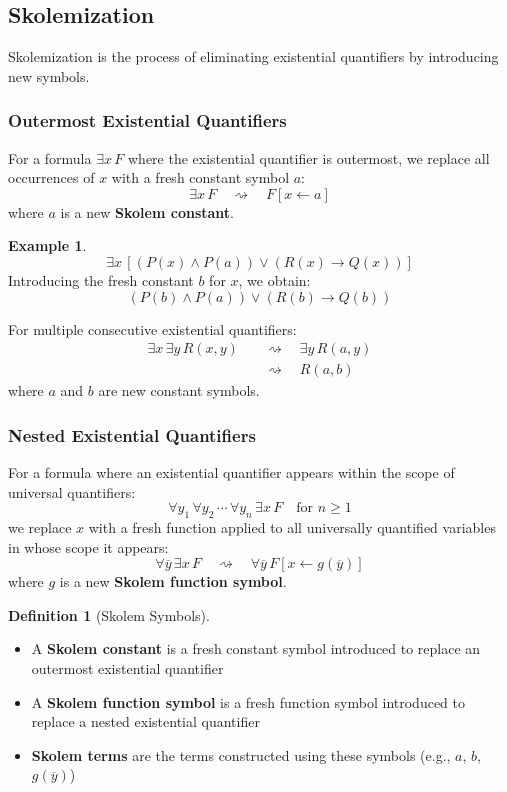 \documentclass[11pt,a4paper]{article}
\theoremstyle{definition}
\newtheorem{definition}{Definition}[section]
\newtheorem{example}{Example}[section]
\theoremstyle{plain}
\theoremstyle{remark}
\begin{document}
\subsection{Skolemization}

Skolemization is the process of eliminating existential quantifiers by introducing new symbols.

\subsubsection{Outermost Existential Quantifiers}

For a formula $\exists x \, F$ where the existential quantifier is outermost, we replace all occurrences of $x$ with a fresh constant symbol $a$:
\[
\exists x \, F \quad \rightsquigarrow \quad F[x \leftarrow a]
\]
where $a$ is a new \textbf{Skolem constant}.

\begin{example}
\[
\exists x \, [(P(x) \wedge P(a)) \vee (R(x) \rightarrow Q(x))]
\]
Introducing the fresh constant $b$ for $x$, we obtain:
\[
(P(b) \wedge P(a)) \vee (R(b) \rightarrow Q(b))
\]
\end{example}

For multiple consecutive existential quantifiers:
\begin{align*}
\exists x \, \exists y \, R(x, y) 
&\quad \rightsquigarrow \quad \exists y \, R(a, y) \\
&\quad \rightsquigarrow \quad R(a, b)
\end{align*}
where $a$ and $b$ are new constant symbols.

\subsubsection{Nested Existential Quantifiers}

For a formula where an existential quantifier appears within the scope of universal quantifiers:
\[
\forall y_1 \, \forall y_2 \, \cdots \, \forall y_n \, \exists x \, F \quad \text{for } n \geq 1
\]
we replace $x$ with a fresh function applied to all universally quantified variables in whose scope it appears:
\[
\forall \overline{y} \, \exists x \, F \quad \rightsquigarrow \quad \forall \overline{y} \, F[x \leftarrow g(\overline{y})]
\]
where $g$ is a new \textbf{Skolem function symbol}.

\begin{definition}[Skolem Symbols]
\begin{itemize}
    \item A \textbf{Skolem constant} is a fresh constant symbol introduced to replace an outermost existential quantifier
    \item A \textbf{Skolem function symbol} is a fresh function symbol introduced to replace a nested existential quantifier
    \item \textbf{Skolem terms} are the terms constructed using these symbols (e.g., $a$, $b$, $g(\overline{y})$)
\end{itemize}
\end{definition}
\end{document}
